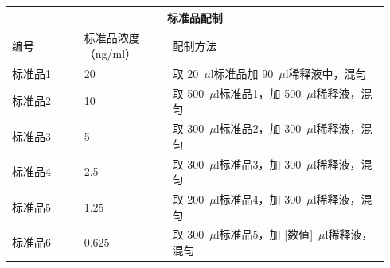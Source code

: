 \documentclass[UTF8,10pt,a4paper,fontset=fandol]{ctexart}
\newcommand{\fieldvalue}[1]{#1}
\newcommand{\handwritten}[1]{#1}
\begin{document}
\begin{center}
\small
\begin{tabular}{|p{0.18\linewidth}|p{0.22\linewidth}|p{0.54\linewidth}|}
\hline
\multicolumn{3}{|c|}{标准品配制}\\
\hline
编号 & 标准品浓度（ng/ml） & 配制方法\\
\hline
标准品1 & 20 &
取
\fieldvalue{\handwritten{20}}~$\mu$l标准品加
\fieldvalue{\handwritten{90}}~$\mu$l稀释液中，混匀\\
\hline
标准品2 & 10 &
取
\fieldvalue{\handwritten{500}}~$\mu$l标准品1，加
\fieldvalue{\handwritten{500}}~$\mu$l稀释液，混匀\\
\hline
标准品3 & 5 &
取
\fieldvalue{\handwritten{300}}~$\mu$l标准品2，加
\fieldvalue{\handwritten{300}}~$\mu$l稀释液，混匀\\
\hline
标准品4 & 2.5 &
取
\fieldvalue{\handwritten{300}}~$\mu$l标准品3，加
\fieldvalue{\handwritten{300}}~$\mu$l稀释液，混匀\\
\hline
标准品5 & 1.25 &
取
\fieldvalue{\handwritten{200}}~$\mu$l标准品4，加
\fieldvalue{\handwritten{300}}~$\mu$l稀释液，混匀\\
\hline
标准品6 & 0.625 &
取
\fieldvalue{\handwritten{300}}~$\mu$l标准品5，加
\fieldvalue{\handwritten{[数值]}}~$\mu$l稀释液，混匀\\
\hline
\end{tabular}
\end{center}
\end{document}
